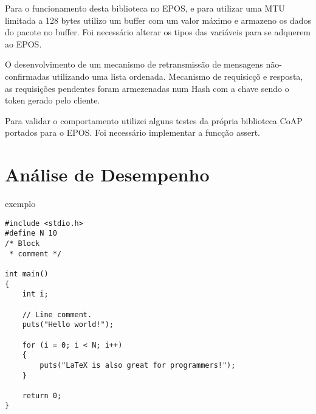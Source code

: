 Para o funcionamento desta biblioteca no EPOS, e para utilizar uma MTU limitada a 128 bytes utilizo um buffer com um valor m\'aximo e armazeno os dados do pacote no buffer. Foi necess\'ario alterar os tipos das vari\'aveis para se adquerem ao EPOS.

O desenvolvimento de um mecanismo de retransmiss\~ao de mensagens n\~ao-confirmadas utilizando uma lista ordenada. Mecanismo de requisic\c{c}\~o e resposta, as requisi\c{c}\~oes pendentes foram armezenadas num Hash com a chave sendo o token gerado pelo cliente.

Para validar o comportamento utilizei alguns testes da pr\'opria biblioteca CoAP portados para o EPOS. Foi necess\'ario implementar a func\c{c}\~ao assert.

\section{An\'alise de Desempenho}
exemplo


\lstset{escapechar=@,style=customc}

\begin{lstlisting}
#include <stdio.h>
#define N 10
/* Block
 * comment */
 
int main()
{
    int i;
 
    // Line comment.
    puts("Hello world!");
 
    for (i = 0; i < N; i++)
    {
        puts("LaTeX is also great for programmers!");
    }
 
    return 0;
}
\end{lstlisting}

